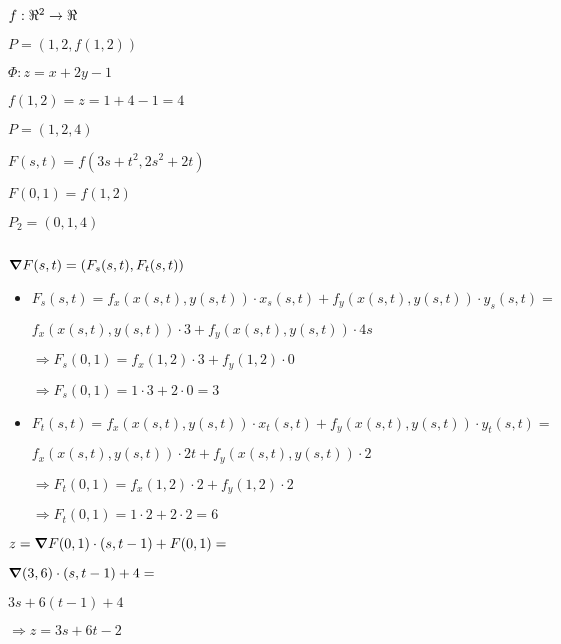 \documentclass[../parcial.tex]{subfiles}
\begin{document}
    $ f: \real^2 \to \real $

    $P = (1,2,f(1,2))$

    $\Phi : z = x + 2y - 1$

    $ f(1,2) = z = 1 + 4 - 1 = 4$

    $ P = (1, 2, 4)$

    $ F(s,t) = f(3s + t^2,2s^2+2t) $

    $ F(0,1) = f(1,2) $

    $ P_2 = (0,1,4) $

    $ $

    $ \grad F(s,t) = (F_s(s,t), F_t(s,t))$

    \begin{itemize}
        \item $ F_s(s,t) = f_x(x(s,t),y(s,t))\cdot x_s(s,t) + f_y(x(s,t), y(s,t))\cdot y_s(s,t) = $

            $ f_x(x(s,t),y(s,t))\cdot 3 + f_y(x(s,t), y(s,t))\cdot 4s $

            $ \Rightarrow F_s(0,1) = f_x(1,2) \cdot 3 + f_y(1,2) \cdot 0 $

            $ \Rightarrow F_s(0,1) = 1 \cdot 3 + 2 \cdot 0 = 3 $

        \item $ F_t(s,t) = f_x(x(s,t),y(s,t))\cdot x_t(s,t) + f_y(x(s,t), y(s,t))\cdot y_t(s,t) = $
        
            $ f_x(x(s,t),y(s,t))\cdot 2t + f_y(x(s,t), y(s,t))\cdot 2 $

            $ \Rightarrow F_t(0,1) = f_x(1,2)\cdot 2 + f_y(1,2)\cdot 2 $

            $ \Rightarrow F_t(0,1) = 1\cdot 2 + 2\cdot 2  = 6$

    \end{itemize}

    $ z = \grad F(0,1)\cdot(s,t-1) + F(0,1) = $

    $ \grad (3,6)\cdot(s,t-1) + 4 = $

    $ 3s + 6(t-1) + 4 $

    $\Rightarrow z = 3s + 6t -2$
    
\end{document}
